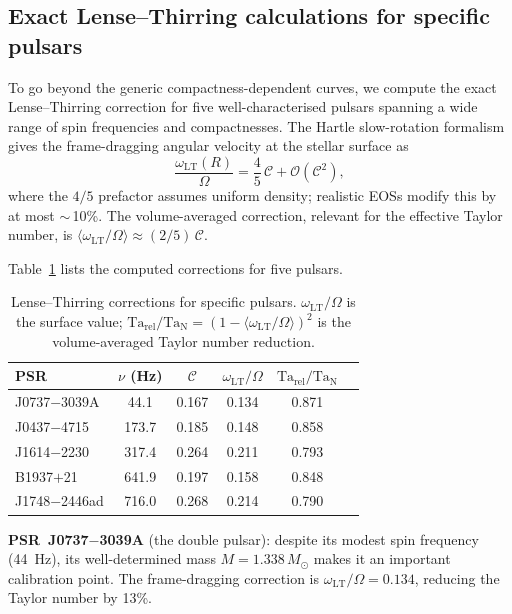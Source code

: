 \subsection{Exact Lense--Thirring calculations for specific pulsars}
\label{sec:rel-63-specific-pulsars}

To go beyond the generic compactness-dependent curves, we compute
the exact Lense--Thirring correction for five well-characterised
pulsars spanning a wide range of spin frequencies and compactnesses.
The Hartle slow-rotation
formalism~\cite{Hartle1967,PaschalidisStergioulas2017} gives the
frame-dragging angular velocity at the stellar surface as
\begin{equation}\label{eq:rel-6-LT-exact}
  \frac{\omega_{\mathrm{LT}}(R)}{\Omega}
  = \frac{4}{5}\,\mathscr{C} + \mathcal{O}(\mathscr{C}^{2}),
\end{equation}
where the $4/5$ prefactor assumes uniform density; realistic EOSs
modify this by at most $\sim$\,10\%.  The volume-averaged
correction, relevant for the effective Taylor number, is
$\langle\omega_{\mathrm{LT}}/\Omega\rangle \approx
(2/5)\,\mathscr{C}$.

Table~\ref{tab:LT-specific-pulsars} lists the computed corrections
for five pulsars.

\begin{table}[ht]
\centering
\caption{Lense--Thirring corrections for specific pulsars.
$\omega_{\mathrm{LT}}/\Omega$ is the surface value;
$\mathrm{Ta}_{\mathrm{rel}}/\mathrm{Ta}_{\mathrm{N}}
= (1 - \langle\omega_{\mathrm{LT}}/\Omega\rangle)^{2}$ is the
volume-averaged Taylor number reduction.}
\label{tab:LT-specific-pulsars}
\begin{tabular}{lccccc}
\hline
PSR & $\nu$ (Hz) & $\mathscr{C}$ &
  $\omega_{\mathrm{LT}}/\Omega$ &
  $\mathrm{Ta}_{\mathrm{rel}}/\mathrm{Ta}_{\mathrm{N}}$ \\
\hline
J0737$-$3039A & 44.1 & 0.167 & 0.134 & 0.871 \\
J0437$-$4715 & 173.7 & 0.185 & 0.148 & 0.858 \\
J1614$-$2230 & 317.4 & 0.264 & 0.211 & 0.793 \\
B1937$+$21 & 641.9 & 0.197 & 0.158 & 0.848 \\
J1748$-$2446ad & 716.0 & 0.268 & 0.214 & 0.790 \\
\hline
\end{tabular}
\end{table}

\noindent\textbf{PSR~J0737$-$3039A} (the double pulsar): despite its
modest spin frequency (44~Hz), its well-determined mass
$M = 1.338\,M_{\odot}$ makes it an important calibration point.
The frame-dragging correction is $\omega_{\mathrm{LT}}/\Omega =
0.134$, reducing the Taylor number by 13\%.

